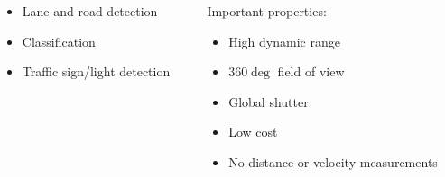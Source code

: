 {\begin{frame}
\begin{columns}[T]
\begin{column}{.5\textwidth}
\begin{columns}[T]
\begin{column}{0.45\textwidth}
\begin{itemize}
                    \item Lane and road detection
                    \item Classification
                    \item Traffic sign/light detection
                \end{itemize}
            \end{column}
            \begin{column}{0.55\textwidth}
                \footnotesize
                Important properties:
                \begin{itemize}
                    \item High dynamic range
                    \item $360\deg$ field of view
                    \item Global shutter
                    \item Low cost
                    \item No distance or velocity measurements
                \end{itemize}
            \end{column}
        \end{columns}
    \end{column}
\end{columns}

\end{frame}

}
